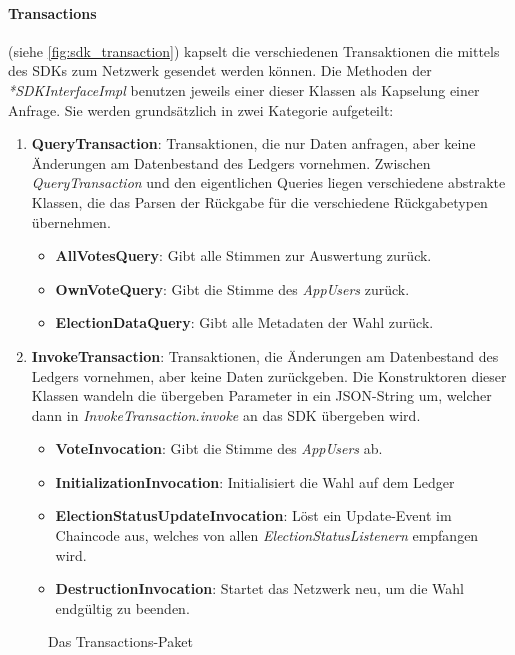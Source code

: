 \documentclass[parskip=full]{scrartcl}
\newcommand{\textitx}[1]{\mbox{\textit{#1}}}
\newcommand{\fakeparagraph}[1]{\textbf{#1}}
\begin{document}
	\paragraph{Transactions} (siehe \autoref{fig:sdk_transaction}) kapselt die verschiedenen Transaktionen die mittels des SDKs zum Netzwerk gesendet werden können. Die Methoden der \textit{*SDKInterfaceImpl} benutzen jeweils einer dieser Klassen als Kapselung einer Anfrage. Sie werden grundsätzlich in zwei Kategorie aufgeteilt:
	\begin{enumerate}
			\item\fakeparagraph{QueryTransaction}: Transaktionen, die nur Daten anfragen, aber keine Änderungen am Datenbestand des Ledgers vornehmen. Zwischen \textit{QueryTransaction} und den eigentlichen Queries liegen verschiedene abstrakte Klassen, die das Parsen der Rückgabe für die verschiedene Rückgabetypen übernehmen.
			\begin{itemize}
				\item \fakeparagraph{AllVotesQuery}: Gibt alle Stimmen zur Auswertung zurück.
				\item \fakeparagraph{OwnVoteQuery}: Gibt die Stimme des \textit{AppUsers} zurück.
				\item \fakeparagraph{ElectionDataQuery}: Gibt alle Metadaten der Wahl zurück.
			\end{itemize}
			\item \fakeparagraph{InvokeTransaction}: Transaktionen, die Änderungen am Datenbestand des Ledgers vornehmen, aber keine Daten zurückgeben. Die Konstruktoren dieser Klassen wandeln die übergeben Parameter in ein JSON-String um, welcher dann in \textitx{InvokeTransaction.invoke} an das SDK übergeben wird.
			\begin{itemize}
				\item \fakeparagraph{VoteInvocation}: Gibt die Stimme des \textit{AppUsers} ab.
				\item \fakeparagraph{InitializationInvocation}: Initialisiert die Wahl auf dem Ledger
				\item \fakeparagraph{ElectionStatusUpdateInvocation}: Löst ein Update-Event im Chaincode aus, welches von allen \textit{ElectionStatusListenern} empfangen wird.
				\item \fakeparagraph{DestructionInvocation}: Startet das Netzwerk neu, um die Wahl endgültig zu beenden.
			\end{itemize}
	\end{enumerate}
	\newpage
	\begin{sidewaysfigure}[!h]
		\centering
		\hspace{-100pt}
		\centerline{}
		\caption{Das Transactions-Paket}
		\label{fig:sdk_transaction}
	\end{sidewaysfigure}
	\thispagestyle{empty}
\end{document}
